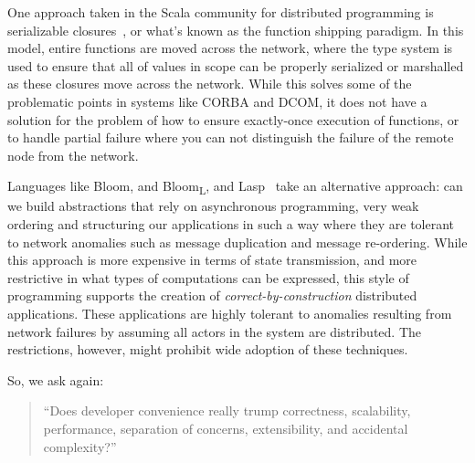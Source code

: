One approach taken in the Scala community for distributed programming is serializable closures~\cite{miller2014spores}, or what's known as the function shipping paradigm.  In this model, entire functions are moved across the network, where the type system is used to ensure that all of values in scope can be properly serialized or marshalled as these closures move across the network.  While this solves some of the problematic points in systems like CORBA and DCOM, it does not have a solution for the problem of how to ensure exactly-once execution of functions, or to handle partial failure where you can not distinguish the failure of the remote node from the network.

Languages like Bloom, and Bloom\textsubscript{L}, and Lasp~\cite{alvaro2011consistency, conway2012logic, meiklejohn2015lasp} take an alternative approach: can we build abstractions that rely on asynchronous programming, very weak ordering and structuring our applications in such a way where they are tolerant to network anomalies such as message duplication and message re-ordering.  While this approach is more expensive in terms of state transmission, and more restrictive in what types of computations can be expressed, this style of programming supports the creation of \textit{correct-by-construction} distributed applications.  These applications are highly tolerant to anomalies resulting from network failures by assuming all actors in the system are distributed.  The restrictions, however, might prohibit wide adoption of these techniques.

So, we ask again:

\begin{quote}
``Does developer convenience really trump correctness, scalability,
performance, separation of concerns, extensibility, and accidental
complexity?''~\cite{vinoski2008convenience}
\end{quote}